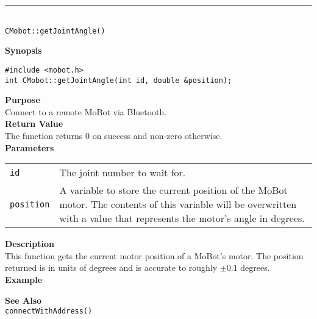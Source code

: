\noindent
\vspace{5pt}
\rule{4.5in}{0.015in}\\
\noindent
{\LARGE \texttt{CMobot::getJointAngle()}}\\
{}

\noindent
{\bf Synopsis}\\
\begin{verbatim}
#include <mobot.h>
int CMobot::getJointAngle(int id, double &position);
\end{verbatim}

\noindent
{\bf Purpose}\\
Connect to a remote MoBot via Bluetooth.\\

\noindent
{\bf Return Value}\\
The function returns 0 on success and non-zero otherwise.\\

\noindent
{\bf Parameters}\\
\vspace{-0.1in}
\begin{description}
\item               
\begin{tabular}{p{10 mm}p{145 mm}}
\texttt{id} & The joint number to wait for. \\
\texttt{position} & A variable to store the current position of the MoBot
motor. The contents of this variable will be overwritten with a value that
represents the motor's angle in degrees.  \\
\end{tabular}
\end{description}

\noindent
{\bf Description}\\
This function gets the current motor position of a MoBot's motor. The
position returned is in units of degrees and is accurate to roughly $\pm0.1$
degrees. \\

\noindent
{\bf Example}\\
\noindent

\noindent
{\bf See Also}\\
\texttt{connectWithAddress()}

